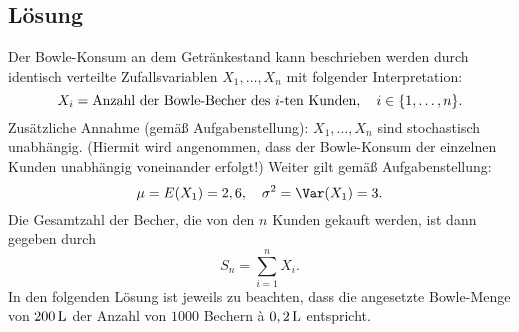 \documentclass{exercise}
\begin{document}
    \subsection*{Lösung}
    Der Bowle-Konsum an dem Getränkestand kann beschrieben werden durch identisch verteilte Zufallsvariablen \(X_1, \ldots, X_n\) mit folgender Interpretation:
    \[
        X_i = \text{Anzahl der Bowle-Becher des }i\text{-ten Kunden}, \quad i \in \braces*{1, \ldots, n}.
    \]
    Zusätzliche Annahme (gemäß Aufgabenstellung): \(X_1, \ldots, X_n\) sind stochastisch unabhängig.
    (Hiermit wird angenommen, dass der Bowle-Konsum der einzelnen Kunden unabhängig voneinander erfolgt!)
    Weiter gilt gemäß Aufgabenstellung:
    \[
        \mu = E\parentheses*{X_1} = 2,6, \quad \sigma^2 = \Var\parentheses*{X_1} = 3.
    \]
    Die Gesamtzahl der Becher, die von den \(n\) Kunden gekauft werden, ist dann gegeben durch
    \[
        S_n = \sum_{i = 1}^n X_i.
    \]
    In den folgenden Lösung ist jeweils zu beachten, dass die angesetzte Bowle-Menge von \(200\,\si{\liter}\) der Anzahl von \(1000\) Bechern à \(0,2\,\si{\liter}\) entspricht.
\end{document}
